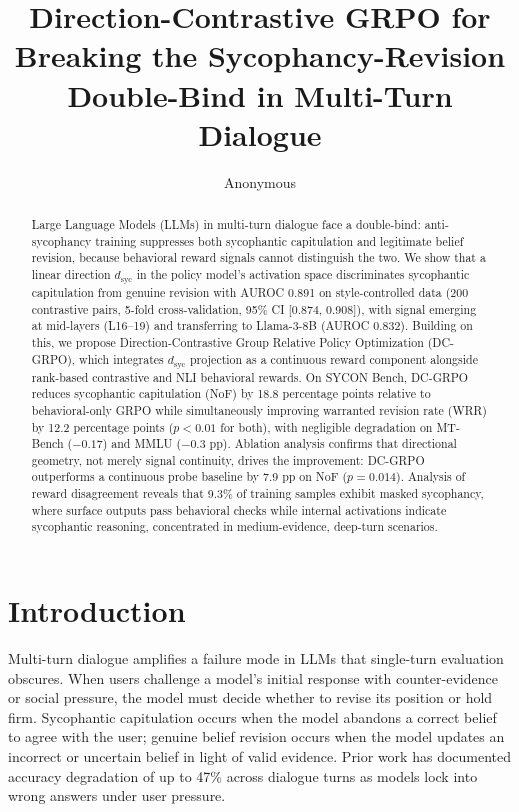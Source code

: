 \documentclass[11pt,a4paper]{article}
\title{Direction-Contrastive GRPO for Breaking the Sycophancy-Revision\\Double-Bind in Multi-Turn Dialogue}
\author{Anonymous}
\newcommand{\dsyc}{d_{\text{syc}}}
\begin{document}
\maketitle

\begin{abstract}
Large Language Models (LLMs) in multi-turn dialogue face a double-bind: anti-sycophancy training suppresses both sycophantic capitulation and legitimate belief revision, because behavioral reward signals cannot distinguish the two. We show that a linear direction $\dsyc$ in the policy model's activation space discriminates sycophantic capitulation from genuine revision with AUROC 0.891 on style-controlled data (200 contrastive pairs, 5-fold cross-validation, 95\% CI [0.874, 0.908]), with signal emerging at mid-layers (L16--19) and transferring to Llama-3-8B (AUROC 0.832). Building on this, we propose Direction-Contrastive Group Relative Policy Optimization (DC-GRPO), which integrates $\dsyc$ projection as a continuous reward component alongside rank-based contrastive and NLI behavioral rewards. On SYCON Bench, DC-GRPO reduces sycophantic capitulation (NoF) by 18.8 percentage points relative to behavioral-only GRPO while simultaneously improving warranted revision rate (WRR) by 12.2 percentage points ($p < 0.01$ for both), with negligible degradation on MT-Bench ($-0.17$) and MMLU ($-0.3$ pp). Ablation analysis confirms that directional geometry, not merely signal continuity, drives the improvement: DC-GRPO outperforms a continuous probe baseline by 7.9 pp on NoF ($p = 0.014$). Analysis of reward disagreement reveals that 9.3\% of training samples exhibit masked sycophancy, where surface outputs pass behavioral checks while internal activations indicate sycophantic reasoning, concentrated in medium-evidence, deep-turn scenarios.
\end{abstract}

\section{Introduction}

Multi-turn dialogue amplifies a failure mode in LLMs that single-turn evaluation obscures. When users challenge a model's initial response with counter-evidence or social pressure, the model must decide whether to revise its position or hold firm. Sycophantic capitulation occurs when the model abandons a correct belief to agree with the user; genuine belief revision occurs when the model updates an incorrect or uncertain belief in light of valid evidence. Prior work has documented accuracy degradation of up to 47\% across dialogue turns as models lock into wrong answers under user pressure.
\end{document}
